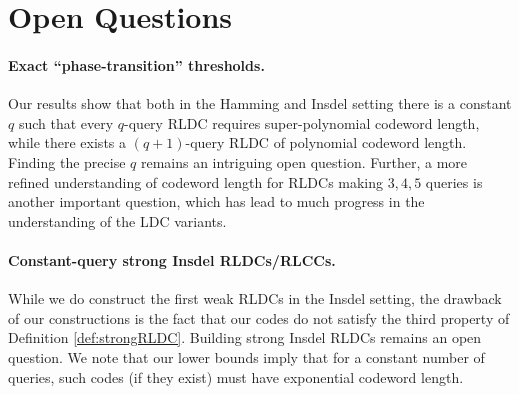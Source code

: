


\section{Open Questions}\label{sec:openproblems}

\paragraph{Exact ``phase-transition'' thresholds.} Our results show that both in the Hamming and Insdel setting there is a constant $q$ such that every $q$-query RLDC requires super-polynomial codeword length, while there exists a $(q+1)$-query RLDC of polynomial codeword length. 
Finding the precise $q$ remains an intriguing open question. Further, a more refined understanding of codeword length for RLDCs making $3, 4, 5$ queries is another important question, which has lead to much progress in the understanding of the LDC variants.


\paragraph{Constant-query strong Insdel RLDCs/RLCCs.} While we do construct the first weak RLDCs in the Insdel setting, the drawback of our constructions is the fact that our codes do not satisfy the third property of Definition \ref{def:strongRLDC}. Building strong Insdel RLDCs remains an open question. We note that our lower bounds imply that for a constant number of queries, such codes (if they exist) must have exponential codeword length.


